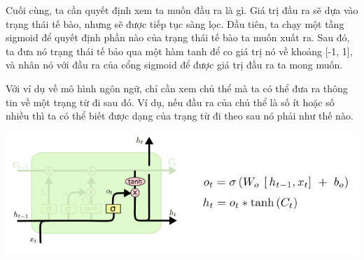 Cuối cùng, ta cần quyết định xem ta muốn đầu ra là gì. Giá trị đầu ra sẽ dựa vào trạng thái tế bào, nhưng sẽ được tiếp tục sàng lọc. Đầu tiên, ta chạy một tầng sigmoid để quyết định phần nào của trạng thái tế bào ta muốn xuất ra. Sau đó, ta đưa nó trạng thái tế bảo qua một hàm tanh để co giá trị nó về khoảng [-1, 1], và nhân nó với đầu ra của cổng sigmoid để được giá trị đầu ra ta mong muốn.\par
Với ví dụ về mô hình ngôn ngữ, chỉ cần xem chủ thể mà ta có thể đưa ra thông tin về một trạng từ đi sau đó. Ví dụ, nếu đầu ra của chủ thể là số ít hoặc số nhiều thì ta có thể biết được dạng của trạng từ đi theo sau nó phải như thế nào.
\begin{center}
    \includegraphics[scale=.5]{image/chapter6/bt4.png}
    \begin{figure}[htp]
    \begin{center}
     
    \end{center}
    \end{figure}
\end{center}


